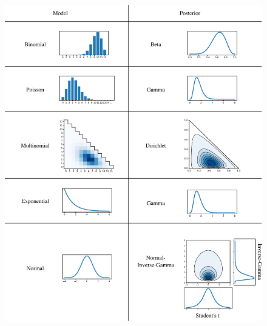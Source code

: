 \newpage
\begin{figure}[h]
	\centering
	\includegraphics[width=\textwidth]{./figs/Exact-Inference-summary.pdf}
\end{figure}

